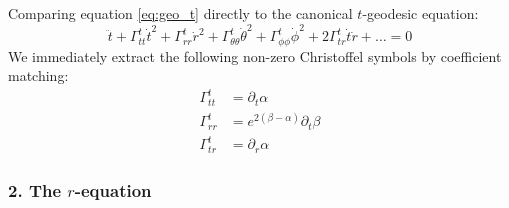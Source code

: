 \documentclass[11pt, a4paper]{report}
\begin{document}
Comparing equation \eqref{eq:geo_t} directly to the canonical $t$-geodesic equation:
\begin{equation}
    \ddot{t} + \Gamma^t_{tt}\dot{t}^2 + \Gamma^t_{rr}\dot{r}^2 + \Gamma^t_{\theta\theta}\dot{\theta}^2 + \Gamma^t_{\phi\phi}\dot{\phi}^2 + 2\Gamma^t_{tr}\dot{t}\dot{r} + \dots = 0
\end{equation}
We immediately extract the following non-zero Christoffel symbols by coefficient matching:
\begin{align}
    \Gamma^t_{tt} &= \partial_t \alpha \\
    \Gamma^t_{rr} &= e^{2(\beta - \alpha)} \partial_t \beta \\
    \Gamma^t_{tr} &= \partial_r \alpha
\end{align}

\subsubsection*{2. The $r$-equation}
\end{document}
